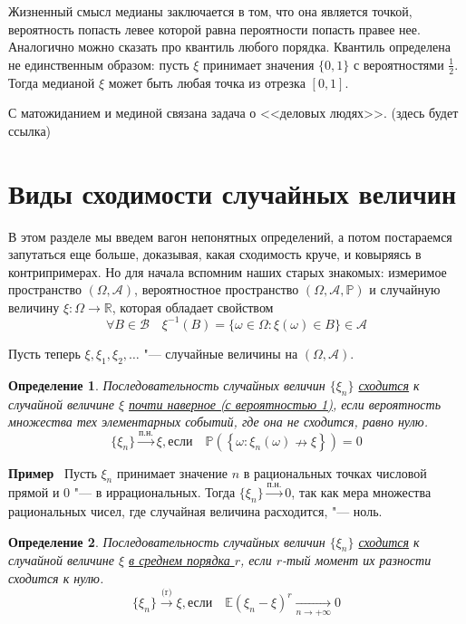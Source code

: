 \documentclass[12pt]{article}
\newtheorem{Def}{Определение}
\newenvironment{Ex}{{\bf Пример}\ }{}
\numberwithin{Th}{section}
\numberwithin{Def}{section}
\numberwithin{Lem}{section}
\numberwithin{St}{section}
\numberwithin{equation}{section}
\newcommand\Set[2]{\left\{ #1 \colon #2 \right\}}
\newcommand\Pro{\mathbb{P}} %
\newcommand\Ev{\mathscr{A}} %
\newcommand\Bor{\mathscr{B}} %
\newcommand\Real{\mathbb{R}} %
\newcommand\Expec{\mathbb{E}} %
\begin{document}
Жизненный смысл медианы заключается в том, что она является точкой, вероятность попасть левее которой равна пероятности попасть правее нее. Аналогично можно 
сказать про квантиль любого порядка. Квантиль определена не единственным образом: пусть $\xi$ принимает значения $\{0, 1\}$ с вероятностями $\frac12$. Тогда медианой
$\xi$ может быть любая точка из отрезка $[0,1]$.

С матожиданием и мединой связана задача о <<деловых людях>>. (здесь будет ссылка) 
\newpage

\section{Виды сходимости случайных величин}

В этом разделе мы введем вагон непонятных определений, а потом постараемся запутаться еще больше, доказывая, какая сходимость круче, и ковыряясь в контрипримерах. Но для начала вспомним наших старых знакомых: измеримое пространство $(\Omega, \Ev)$, вероятностное пространство $(\Omega, \Ev, \Pro)$ и случайную величину $\xi \colon \Omega \rightarrow \Real$, которая обладает свойством
$$\forall B \in \Bor \quad \xi^{-1}(B) = \{ \omega \in \Omega \colon \xi(\omega) \in B \} \in \Ev$$

Пусть теперь $\xi, \xi_1, \xi_2, \dots$ "--- случайные величины на $(\Omega, \Ev)$.

\begin{Def}
Последовательность случайных величин $\{\xi_n\}$ \uline{сходится} к случайной величине $\xi$ \uline{почти наверное (с вероятностью 1)}, если вероятность множества тех элементарных событий, где она не сходится, равно нулю.
$$\{ \xi_n \} \xrightarrow{\text{п.н.}} \xi, \text{если} \quad \Pro(\Set{\omega}{\xi_n(\omega) \nrightarrow \xi}) = 0$$
\end{Def}

\begin{Ex}
Пусть $\xi_n$ принимает значение $n$ в рациональных точках числовой прямой и $0$ "--- в иррациональных. Тогда $\{\xi_n\} \xrightarrow{\text{п.н.}} 0$, так как мера множества рациональных чисел, где случайная величина расходится, "--- ноль.
\end{Ex}

\begin{Def}
Последовательность случайных величин $\{\xi_n\}$ \uline{сходится} к случайной величине $\xi$ \uline{в среднем порядка $r$}, если $r$-тый момент их разности сходится к нулю.
$$\{ \xi_n \} \xrightarrow{\text{(r)}} \xi, \text{если} \quad \Expec(\xi_n - \xi)^r \xrightarrow[n \rightarrow +\infty]{} 0$$
\end{Def}
\end{document}
